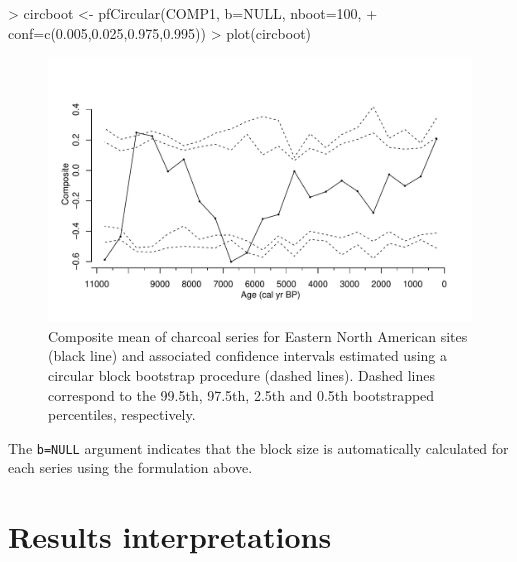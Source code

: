 \documentclass{elsarticle}
\begin{document}
\begin{Schunk}
\begin{Sinput}
> circboot <- pfCircular(COMP1, b=NULL, nboot=100,
+                        conf=c(0.005,0.025,0.975,0.995))
> plot(circboot)
\end{Sinput}
\end{Schunk}

\begin{figure}
\centering
\includegraphics{paleofire-paper-fig3}

\caption{Composite mean of charcoal series for Eastern North American sites (black line) and associated confidence intervals estimated using a circular block bootstrap procedure (dashed lines). Dashed lines correspond to the 99.5th, 97.5th, 2.5th and 0.5th bootstrapped percentiles, respectively.}
\end{figure}
The \texttt{b=NULL} argument indicates that the block size is automatically calculated for each series using the formulation above.

\section{Results interpretations}
\end{document}
